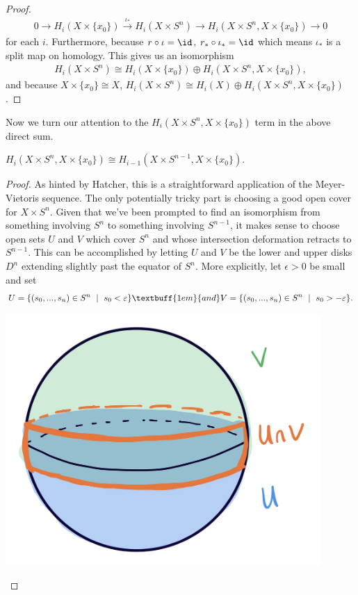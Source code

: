 \begin{homework}[e]
\begin{prf}
\begin{proof}
\begin{align*}
        0 \to H_{i}(X\times \{x_0\}) \xrightarrow{\iota_*} H_i(X\times S^n) \to H_{i}(X\times S^n,X\times \{x_0\})\to 0
      \end{align*}
      for each $i$. Furthermore, because $r\circ \iota = \id$, $r_*\circ \iota_* = \id$ which means $\iota_*$ is a split map on homology. This gives us an isomorphism
      \begin{align*}
        H_i(X\times S^n) \cong H_i(X\times \{x_0\}) \oplus H_i(X\times S^n,X\times \{x_0\}),
      \end{align*}
      and because $X\times \{x_0\}\cong X$, $H_i(X\times S^n) \cong H_i(X) \oplus H_i(X\times S^n,X\times \{x_0\})$.
    \end{proof}

    Now we turn our attention to the $H_i(X\times S^n,X\times \{x_0\})$ term in the above direct sum.
    \begin{lem}\label{lem:problem2.2.36b}
      $H_i(X\times S^n,X\times \{x_0\}) \cong H_{i-1}(X\times S^{n-1}, X\times \{x_0\})$.
    \end{lem}
    \begin{proof}
      As hinted by Hatcher, this is a straightforward application of the Meyer-Vietoris sequence. The only potentially tricky part is choosing a good open cover for $X\times S^n$. Given that we've been prompted to find an isomorphism from something involving $S^n$ to something involving $S^{n-1}$, it makes sense to choose open sets $U$ and $V$ which cover $S^n$ and whose intersection deformation retracts to $S^{n-1}$. This can be accomplished by letting $U$ and $V$ be the lower and upper disks $D^n$ extending slightly past the equator of $S^n$. More explicitly, let $\epsilon > 0$ be small and set
      \begin{align*}
        U = \{(s_0,...,s_n) \in S^n ~ \mid~ s_0 < \epsilon\} \textbuff{1em}{and} V = \{(s_0,...,s_n) \in S^n ~ \mid~ s_0 > -\epsilon\}.
      \end{align*}
      \begin{center}
        \includegraphics[width=12cm]{figures/hwk9-fig4.png}

\end{center}
\end{proof}
\end{prf}
\end{homework}
